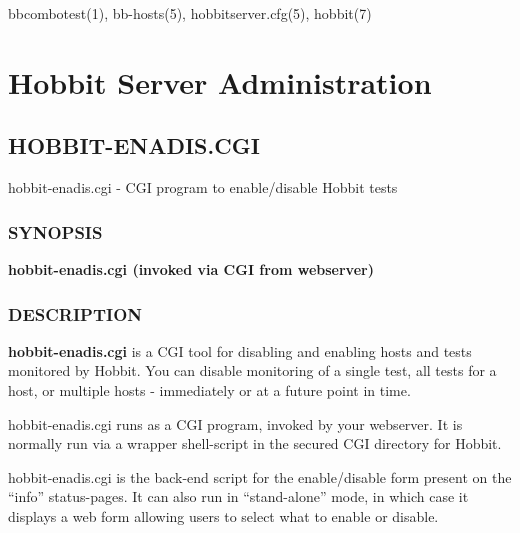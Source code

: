 bbcombotest(1), bb-hosts(5), hobbitserver.cfg(5), hobbit(7) 
  


%
\chapter{Hobbit Server Administration}

%

\newpage
\section{HOBBIT-ENADIS.CGI}
 hobbit-enadis.cgi - CGI program to enable/disable Hobbit tests \
\subsection{SYNOPSIS}
\textbf{hobbit-enadis.cgi (invoked via CGI from webserver)}


 
\subsection{DESCRIPTION}
\textbf{hobbit-enadis.cgi} is a CGI tool for disabling and enabling
hosts and tests monitored by Hobbit. You can disable monitoring of a
single test, all tests for a host, or multiple hosts - immediately or
at a future point in time. 


  hobbit-enadis.cgi runs as a CGI program, invoked by your
  webserver. It is normally run via a wrapper shell-script in the
  secured CGI directory for Hobbit. 



  hobbit-enadis.cgi is the back-end script for the enable/disable form
  present on the ``info'' status-pages. It can also run in
  ``stand-alone'' mode, in which case it displays a web form allowing
  users to select what to enable or disable. 



 


 
